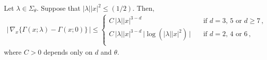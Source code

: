 \begin{thm}
  \label{thm:differenceFundamentalSolutionStokes}
  Let $\lambda \in \Sigma_\theta$.
  Suppose that $|\lambda| |x|^2 \leq ({1}/{2})$.
  Then,
  \begin{align}
    \!\Big|\,\nabla_x \Big\{ \Gamma(x; \lambda) - \Gamma(x; 0) \Big\}\, \Big|
    \leq 
    \begin{cases}
      C\,|\lambda| |x|^{3 - d} &\quad\text{if } d = 3\text{, } 5 \text{ or } d \geq 7\, , \\
      C\,|\lambda| |x|^{3 - d} \, \big| \log(|\lambda| |x|^2)\, \big| &\quad\text{if } d = 2\text{, } 4 \text{ or } 6\,, \\
    \end{cases}
  \end{align}
  where $C > 0$ depends only on $d$ and $\theta$.
\end{thm}

